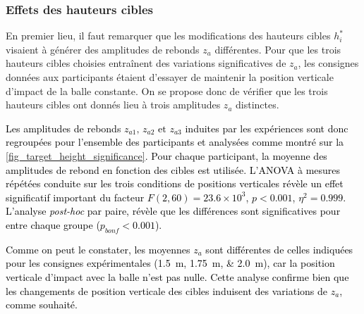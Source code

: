 \subsubsection{Effets des hauteurs cibles} \label{chap4_sec_res_sub_task_2}

En premier lieu, il faut remarquer que les modifications des hauteurs cibles $h^*_i$ visaient à générer des amplitudes de rebonds $z_a$ différentes. Pour que les trois hauteurs cibles choisies entraînent des variations significatives de  $z_a$, les consignes données aux participants étaient d'essayer de maintenir la position verticale d'impact de la balle constante. On se propose donc de vérifier que les trois hauteurs cibles ont donnés lieu à trois amplitudes $z_a$ distinctes.

\textcolor{black}{Les amplitudes de rebonds $z_{a1}\text{, }z_{a2}\text{ et }z_{a3}$ induites par les expériences sont donc regroupées pour l'ensemble des participants et analysées comme montré sur la \cref{fig_target_height_significance}. Pour chaque participant, la moyenne des amplitudes de rebond en fonction des cibles est utilisée. L'ANOVA à mesures répétées conduite sur les trois conditions de positions verticales révèle un effet significatif important du facteur $F(2, 60) = 23.6\times10^3$, $p<0.001$,  $\eta^2 = 0.999$. L'analyse \textit{post-hoc} par paire, révèle que les différences sont significatives pour entre chaque groupe ($p_{bonf} < 0.001$).}



\textcolor{black}{Comme on peut le constater, les moyennes $z_a$ sont différentes de celles indiquées pour les consignes expérimentales (\SIlist{1.5;1.75;2.0}{\meter}), car la position verticale d'impact avec la balle n'est pas nulle. %
Cette analyse confirme bien que les changements de position verticale des cibles induisent des variations de $z_a$, comme souhaité.} %

